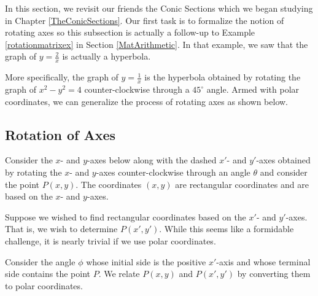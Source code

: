 \documentclass{ximera}
\begin{document}
	\author{Stitz-Zeager}




\setcounter{footnote}{0}

\label{PolarConics}

In this section, we revisit our friends the Conic Sections which we began studying in Chapter \ref{TheConicSections}.  Our first task is to formalize the notion of rotating axes so this subsection is actually a follow-up to Example  \ref{rotationmatrixex} in Section \ref{MatArithmetic}. In that example, we saw that the graph of $y = \frac{2}{x}$ is actually a hyperbola.  

\smallskip

More specifically, the graph of $y = \frac{1}{x}$ is the hyperbola  obtained by rotating the graph of $x^2-y^2=4$ counter-clockwise through a $45^{\circ}$ angle.  Armed with polar coordinates, we can generalize the process of rotating axes as shown below.


\subsection{Rotation of Axes}
\label{rotationaxes}

Consider the $x$- and $y$-axes below along with the dashed $x'$- and $y'$-axes obtained by rotating the $x$- and $y$-axes counter-clockwise through an angle $\theta$ and consider the point $P(x,y)$.  The coordinates $(x,y)$ are rectangular coordinates and are based on the $x$- and $y$-axes.  

\smallskip

Suppose we wished to find rectangular coordinates based on the $x'$- and $y'$-axes.  That is, we wish to determine $P(x',y')$.  While this seems like a formidable challenge, it is nearly trivial if we use polar coordinates.  

\smallskip

Consider the angle $\phi$ whose initial side is the positive $x'$-axis and whose terminal side contains the point $P$.   We relate $P(x,y)$ and $P(x',y')$ by converting them to polar coordinates. 
\end{document}

